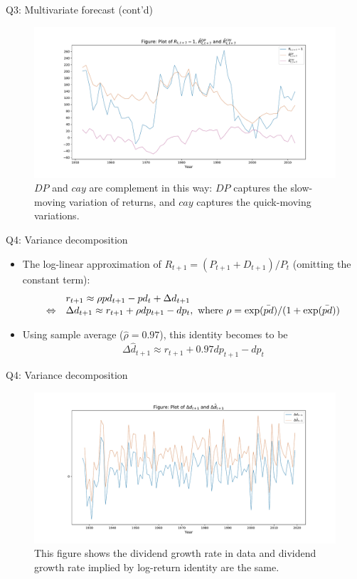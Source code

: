 \documentclass[10pt,t]{beamer}
\begin{document}
\begin{frame}{Q3: Multivariate forecast (cont'd)}
\begin{figure}[h!]
\centering
\includegraphics[width=\linewidth]{q3fig1.pdf}
\caption{$DP$ and $cay$ are complement in this way: $DP$ captures the slow-moving variation of returns, and $cay$ captures the quick-moving variations.}
\end{figure}
\end{frame}





\begin{frame}{Q4: Variance decomposition}
\begin{itemize}
  \item The log-linear approximation of $R_{t+1} = (P_{t+1} + D_{t+1})/P_{t}$ (omitting the constant term):
  $$
  \begin{array}[t]{rl}
  & r_{t+1} \approx \rho pd_{t+1} - pd_t + \Delta d_{t+1} \\
  \Leftrightarrow & \Delta d_{t+1} \approx r_{t+1} + \rho dp_{t+1} - dp_t, \text{ where } \rho = \exp(\bar{pd}) / (1 + \exp(\bar{pd}))
  \end{array}
  $$
  \item Using sample average ($\hat{\rho} = 0.97$), this identity becomes to be
  $$
  \Delta \hat{d}_{t+1} \approx r_{t+1} + 0.97 dp_{t+1} - dp_t
  $$
\end{itemize}
\end{frame}


\begin{frame}{Q4: Variance decomposition}
\begin{figure}[h!]
\centering
\includegraphics[width=\linewidth]{q4fig1.pdf}
\caption{This figure shows the dividend growth rate in data and dividend growth rate implied by log-return identity are the same.}
\end{figure}
\end{frame}
\end{document}
